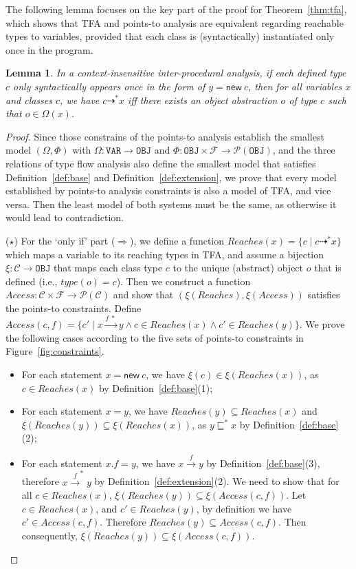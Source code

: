 \documentclass{fac}
\newtheorem{Lemma}{Lemma}
\newcommand{\keyword}[1]{\mathsf{#1}}
\newcommand{\kwnew}[0]{\keyword{new}}
\newcommand\Var{\mathtt{VAR}}
\newcommand\Obj{\mathtt{OBJ}}
\newcommand{\VPT}{\Omega}
\newcommand{\HPT}{\Phi}
\newcommand{\Class}{\mathcal{C}}
\newcommand{\Field}{\mathcal{F}}
\newcommand{\less}{\sqsubseteq}
\newcommand{\tflow}{\dashrightarrow}
\newcommand{\hflow}{\longrightarrow}
\newcommand{\lhflow}[1]{\stackrel{#1}{\hflow}}
\newcommand\set[1]{\{#1\}}
\newcommand\power{\mathcal{P}}
\begin{document}
The following lemma focuses on the key part of the proof for Theorem~\ref{thm:tfa}, which shows that TFA and points-to analysis are equivalent regarding reachable types to variables, provided that each class is (syntactically) instantiated only once in the program. %

\begin{Lemma}\label{lem:tfa-inter}
In a context-insensitive inter-procedural analysis, if each defined type $c$ only syntactically appears once in the form of $y = \kwnew\ c$, then for all variables $x$ and classes $c$, we have $c\tflow^*x$ iff there exists an object abstraction $o$ of type $c$ such that $o\in\VPT(x)$.
\end{Lemma}
\begin{proof}
Since those constrains of the points-to analysis establish the smallest model $(\VPT, \HPT)$ with $\VPT:\Var\rightarrow\Obj$ and $\HPT:\Obj\times\Field\rightarrow\power(\Obj)$, and the three relations of type flow analysis also define the smallest model that satisfies Definition~\ref{def:base} and Definition~\ref{def:extension}, we prove that every model established by points-to analysis constraints is also a model of TFA, and vice versa. Then the least model of both systems must be the same, as otherwise it would lead to contradiction.

\medskip

($\star$) For the `only if' part ($\Rightarrow$), we define a function $Reaches(x)=\set{c\mid c\tflow^* x}$ which maps a variable to its reaching types in TFA, and assume a bijection $\xi:\Class\rightarrow\Obj$ that maps each class type $c$ to the unique (abstract) object $o$ that is defined (i.e., $type(o)=c$). Then we construct a function $Access:\Class\times\Field\rightarrow\power(\Class)$ and show that $(\xi(Reaches),\xi(Access))$ satisfies the points-to constraints. Define $Access(c,f)=\set{c'\mid x\lhflow{f\ *}y\wedge c\in Reaches(x)\wedge c'\in Reaches(y)}$. We prove the following cases according to the five sets of points-to constraints in Figure~\ref{fig:constraints}.
\begin{itemize}
\item For each statement $x = \kwnew\ c$, we have $\xi(c)\in\xi(Reaches(x))$, as $c\in Reaches(x)$ by Definition~\ref{def:base}(1);
\item For each statement $x = y$, we have $Reaches(y)\subseteq Reaches(x)$ and $\xi(Reaches(y))\subseteq\xi(Reaches(x))$, as $y\less^*x$ by Definition~\ref{def:base}(2);
\item For each statement $x.f = y$, we have $x\lhflow{f}y$ by Definition~\ref{def:base}(3), therefore $x\lhflow{f}^*y$ by Definition~\ref{def:extension}(2). We need to show that for all $c\in Reaches(x)$, $\xi(Reaches(y))\subseteq \xi(Access(c,f))$.
      Let $c\in Reaches(x)$, and $c'\in Reaches(y)$, by definition we have $c'\in Access(c,f)$. Therefore $Reaches(y)\subseteq Access(c,f)$. Then consequently, $\xi(Reaches(y))\subseteq \xi(Access(c,f))$.


\end{itemize}
\end{proof}
\end{document}
